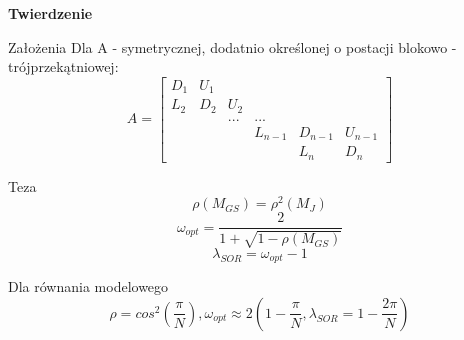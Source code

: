 \begin{frame}{}
  \textbf{Twierdzenie}
  \begin{block}{Założenia}
    Dla A - symetrycznej, dodatnio określonej o postacji blokowo - trójprzekątniowej:
    $$
    A=\begin{bmatrix}
    D_1 & U_1 &&&&\\
    L_2 & D_2 & U_2 &&& \\
    &&...&...&&\\
    &&&L_{n-1}&D_{n-1}&U_{n-1}\\
    &&&&L_n&D_n
    \end{bmatrix}
    $$
  \end{block}
\end{frame}

\begin{frame}
  \begin{block}{Teza}
    $$\rho(M_{GS})=\rho^2(M_J)$$
    $$\omega_{opt}=\frac{2}{1+\sqrt{1-\rho(M_{GS})}}$$
    $$\lambda_{SOR}=\omega_{opt}-1$$
  \end{block}
  \begin{exampleblock}{Dla równania modelowego}
    $$\rho=cos^2(\frac{\pi}{N}), \omega_{opt}\approx2(1-\frac{\pi}{N}, \lambda_{SOR}=1-\frac{2\pi}{N})$$
  \end{exampleblock}
\end{frame}


